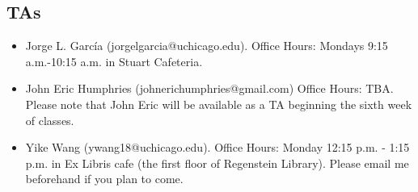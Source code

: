 \documentclass[12pt]{article}
\begin{document}
\subsection{TAs}
\begin{itemize}
\item Jorge L. Garc\'{i}a (jorgelgarcia@uchicago.edu). Office Hours: Mondays 9:15 a.m.-10:15 a.m. in Stuart Cafeteria.  
\item John Eric Humphries (johnerichumphries@gmail.com) Office Hours: TBA. Please note that John Eric will be available as a TA beginning the sixth week of classes.
\item Yike Wang (ywang18@uchicago.edu). Office Hours: Monday 12:15 p.m. - 1:15 p.m. in Ex Libris cafe (the first floor of Regenstein Library). Please email me beforehand if you plan to come.

\end{itemize}
\end{document}
